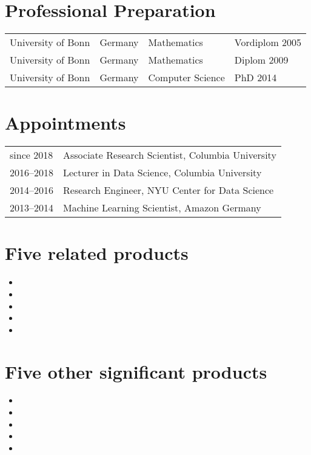 

\section*{Professional Preparation}
\begin{tabular}{l l l l}
University of Bonn& Germany& Mathematics     &  Vordiplom 2005\\
University of Bonn& Germany& Mathematics     &  Diplom 2009\\
University of Bonn& Germany& Computer Science&  PhD 2014\\
\end{tabular}

\section*{Appointments}
\begin{tabular}{l l}
since 2018& Associate Research Scientist, Columbia University\\
2016--2018& Lecturer in Data Science, Columbia University\\
2014--2016& Research Engineer, NYU Center for Data Science\\
2013--2014& Machine Learning Scientist, Amazon Germany\\
\end{tabular}

\section*{Five related products}
\begin{itemize}
    \item {}
    \item {}  %
    \item {}            %
    \item {} %
    \item {}             
\end{itemize}
\pagebreak
\section*{Five other significant products}
\begin{itemize}
    \item {}
    \item {}
    \item {}
    \item {}
    \item {}
\end{itemize}

